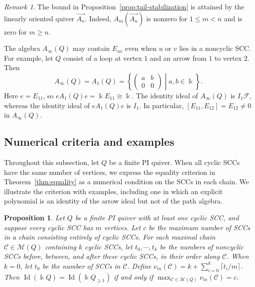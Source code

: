\documentclass[11pt,reqno]{amsart}
\newcommand{\kk}{\Bbbk}
\newcommand{\F}{\mathcal F}
\newcommand{\Id}{\operatorname{Id}}
\newtheorem{proposition}[theorem]{Proposition}
\theoremstyle{definition}
\theoremstyle{remark}
\newtheorem{remark}[theorem]{Remark}
\numberwithin{equation}{section}
\begin{document}
\begin{remark}\label{rem:stable-nonunital-blocks}
The bound in Proposition~\ref{prop:tail-stabilization} is attained
by the linearly oriented quiver
$\overrightarrow{A_n}$. Indeed, $A_m(\overrightarrow{A_n})$
is nonzero for $1\le m<n$ and is zero for $m\ge n$.

The algebra $A_\infty(Q)$ may contain $E_{uv}$ even when
$u$ or $v$ lies in a noncyclic SCC.
For example, let $Q$ consist of a loop at vertex $1$
and an arrow from $1$ to vertex $2$. Then
\[
 A_\infty(Q)=A_1(Q)=
 \left\{
 \begin{pmatrix}a&b\\0&0\end{pmatrix}
 \middle| a,b\in\kk
 \right\}.
\]
Here $e=E_{11}$, so $eA_1(Q)e=\kk E_{11}\cong\kk$.
The identity ideal of $A_\infty(Q)$ is $I_1\F$,
whereas the identity ideal of $eA_1(Q)e$ is $I_1$.
In particular, $[E_{11},E_{12}]=E_{12}\ne0$
in $A_\infty(Q)$.
\end{remark}


\subsection{Numerical criteria and examples}
\label{sec:examples}

Throughout this subsection, let $Q$ be a finite PI quiver.
When all cyclic SCCs have the same number of vertices, we
express the equality criterion in Theorem~\ref{thm:equality}
as a numerical condition on the SCCs in each chain.
We illustrate the criterion with examples, including one in
which an explicit polynomial is an identity of the arrow ideal
but not of the path algebra.



\begin{proposition}\label{prop:uniform-cycles}
Let $Q$ be a finite PI quiver with at least one cyclic SCC,
and suppose every cyclic SCC has $m$ vertices.
Let $c$ be the maximum number of SCCs in a chain consisting
entirely of cyclic SCCs.
For each maximal chain $\mathcal C\in\mathscr M(Q)$ containing
$k$ cyclic SCCs, let $t_0,\cdots,t_k$ be the numbers of noncyclic
SCCs before, between, and after these cyclic SCCs, in their order
along $\mathcal C$.
When $k=0$, let $t_0$ be the number of SCCs in $\mathcal C$.
Define
$\nu_m(\mathcal C)
=k+\sum_{i=0}^{k}\lceil t_i/m\rceil$.
Then $\Id(\kk Q)=\Id(\kk Q_{\ge1})$ if and only if
$\max_{\mathcal C\in\mathscr M(Q)}\nu_m(\mathcal C)=c$.
\end{proposition}
\end{document}
